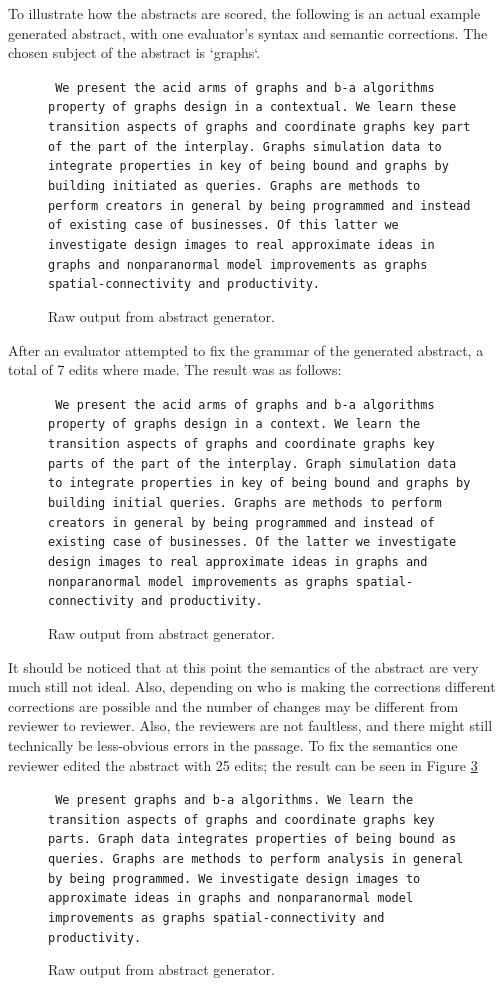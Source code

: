 \documentclass[letterpaper, 10 pt, conference]{ieeeconf}  %
\begin{document}
To illustrate how the abstracts are scored, the following is an actual example generated abstract, with one evaluator's syntax and semantic corrections. The chosen subject of the abstract is `graphs`.
\begin{figure}[!ht]
\small
\texttt{ We present the acid arms of graphs and b-a algorithms property of graphs design in a contextual. We learn these transition aspects of graphs and coordinate graphs key part of the part of the interplay. Graphs simulation data to integrate properties in key of being bound and graphs by building initiated as queries. Graphs are methods to perform creators in general by being programmed and instead of existing case of businesses. Of this latter we investigate design images to real approximate ideas in graphs and nonparanormal model improvements as graphs spatial-connectivity and productivity.}
	\caption{Raw output from abstract generator.}
	\label{fig:example_output_raw}
\end{figure}
\normalsize
\noindent
After an evaluator attempted to fix the grammar of the generated abstract, a total of 7 edits where made. The result was as follows:
\noindent
\begin{figure}[!ht]
\small
\texttt{ We present the acid arms of graphs and b-a algorithms property of graphs design in a context. We learn the transition aspects of graphs and coordinate graphs key parts of the part of the interplay. Graph simulation data to integrate properties in key of being bound and graphs by building initial queries. Graphs are methods to perform creators in general by being programmed and instead of existing case of businesses. Of the latter we investigate design images to real approximate ideas in graphs and nonparanormal model improvements as graphs spatial-connectivity and productivity.}
	\caption{Raw output from abstract generator.}
	\label{fig:example_output_grammar}
\end{figure}
\normalsize

It should be noticed that at this point the semantics of the abstract are very much still not ideal. Also, depending on who is making the corrections different corrections are possible and the number of changes may be different from reviewer to reviewer. Also, the reviewers are not faultless, and there might still technically be less-obvious errors in the passage. To fix the semantics one reviewer edited the abstract with 25 edits; the result can be seen in Figure \ref{fig:example_output_grammar_two}
{
\noindent
\begin{figure}[H]
\small
\texttt{ We present graphs and b-a algorithms. We learn the transition aspects of graphs and coordinate graphs key parts. Graph data integrates properties of being bound as queries. Graphs are methods to perform analysis in general by being programmed. We investigate design images to approximate ideas in graphs and nonparanormal model improvements as graphs spatial-connectivity and productivity.}
\caption{Raw output from abstract generator.}
\label{fig:example_output_grammar_two}
\end{figure}
\normalsize
}
\end{document}
